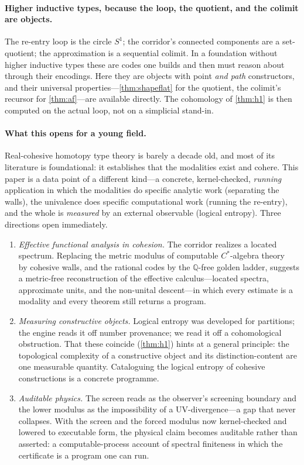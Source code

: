 \documentclass[11pt,letterpaper]{article}
\theoremstyle{plain}
\theoremstyle{definition}
\theoremstyle{remark}
\newcommand{\QQ}{\mathbb{Q}}
\begin{document}
\paragraph{Higher inductive types, because the loop, the quotient, and the colimit are objects.}
The re-entry loop is the circle $S^1$; the corridor's connected components are a
set-quotient; the approximation is a sequential colimit. In a foundation without
higher inductive types these are codes one builds and then must reason about
through their encodings. Here they are objects with point \emph{and path}
constructors, and their universal properties---\cref{thm:shapeflat} for the
quotient, the colimit's recursor for \cref{thm:af}---are available directly. The
cohomology of \cref{thm:h1} is then computed on the actual loop, not on a
simplicial stand-in.

\paragraph{What this opens for a young field.}
Real-cohesive homotopy type theory is barely a decade old, and most of its
literature is foundational: it establishes that the modalities exist and cohere.
This paper is a data point of a different kind---a concrete, kernel-checked,
\emph{running} application in which the modalities do specific analytic work
(separating the walls), the univalence does specific computational work (running
the re-entry), and the whole is \emph{measured} by an external observable (logical
entropy). Three directions open immediately.

\begin{enumerate}[leftmargin=2.0em]
\item \emph{Effective functional analysis in cohesion.} The corridor realizes a
located spectrum. Replacing the metric modulus of computable $C^\ast$-algebra
theory~\citep{eagle2017computable} by cohesive walls, and the rational codes by the
$\QQ$-free golden ladder, suggests a metric-free reconstruction of the effective
calculus---located spectra, approximate units, and the non-unital descent---in
which every estimate is a modality and every theorem still returns a program.
\item \emph{Measuring constructive objects.} Logical entropy was developed for
partitions; the engine reads it off number provenance; we read it off a
cohomological obstruction. That these coincide (\cref{thm:h1}) hints at a general
principle: the topological complexity of a constructive object and its
distinction-content are one measurable quantity. Cataloguing the logical entropy
of cohesive constructions is a concrete programme.
\item \emph{Auditable physics.} The screen reads as
the observer's screening boundary and the lower modulus as the impossibility of a
UV-divergence---a gap that never collapses. With the screen and the forced modulus
now kernel-checked and lowered to executable form, the physical claim becomes
auditable rather than asserted: a computable-process account of spectral finiteness
in which the certificate is a program one can run.
\end{enumerate}
\end{document}
